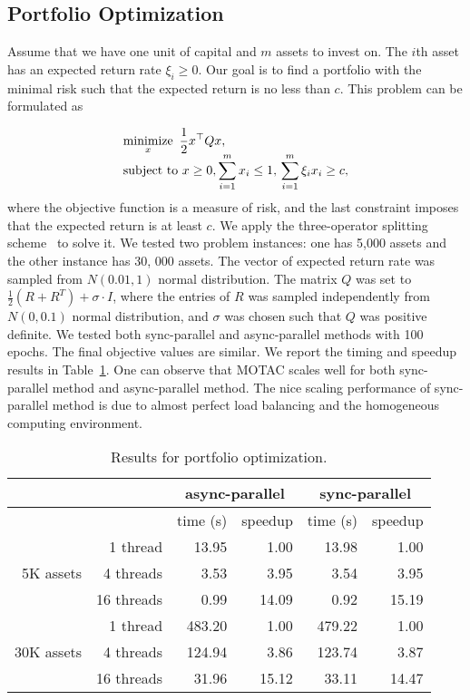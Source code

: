 \subsection{Portfolio Optimization}
Assume that we have one unit of capital and $m$ assets to invest on. The $i$th asset has an expected return rate $\xi_i\ge 0$. Our goal is to find a portfolio with the minimal risk such that the expected return is no less than $c$. This problem can be formulated as

\begin{equation*}
\begin{array}{l}
\displaystyle
\operatorname*{minimize}_x ~ \frac{1}{2} x^\top Q x, \\
\displaystyle
\text{subject to}~ x\ge0, \sum_{i=1}^m x_i\le 1,\, \sum_{i=1}^m\xi_i x_i\ge c,
\end{array}
\end{equation*}
where the objective function is a measure of risk, and the last constraint imposes that the expected return is at least $c$. We apply the three-operator splitting scheme~\citep{DavisYin2015_threeoperator} to solve it. 
We tested two problem instances: one has 5,000 assets and the other instance has 30, 000 assets. 
The vector of expected return rate was sampled from $N(0.01, 1)$ normal distribution.
The matrix $Q$ was set to $\frac{1}{2} (R + R^T) + \sigma \cdot I$, where the entries of $R$ was sampled independently from $N(0, 0.1)$ normal distribution, and $\sigma$ was chosen such that $Q$ was positive definite.
We tested both sync-parallel and async-parallel methods with 100 epochs. The final objective values are similar. We report the timing and speedup results in Table~\ref{tab:port_opt}. One can observe that  MOTAC scales well for both sync-parallel method and async-parallel method. The nice scaling performance of sync-parallel method is due to almost perfect load balancing and the homogeneous computing environment.
\begin{table}[!hb]
\centering
\begin{tabular}{rrrrrr}
\toprule
\multirow{2}{*}{} & &  \multicolumn{2}{c}{async-parallel} & \multicolumn{2}{c}{sync-parallel} \\
\midrule
 & & time (s) & speedup & time (s) & speedup \\
 \midrule
 \multirow{3}{*}{5K assets} & 1 thread & 13.95& 1.00 & 13.98& 1.00 \\
  & 4 threads & 3.53& 3.95 &3.54 & 3.95\\
 & 16 threads & 0.99 &14.09 &0.92 & 15.19\\
\midrule 
 \multirow{3}{*}{30K assets} & 1 thread & 483.20& 1.00& 479.22& 1.00 \\
  & 4 threads & 124.94& 3.86 &123.74 & 3.87\\
 & 16 threads & 31.96 &15.12 &33.11 & 14.47\\ 
\bottomrule
\end{tabular}
 \caption{\label{tab:port_opt}Results for portfolio optimization. }                  
\end{table}

